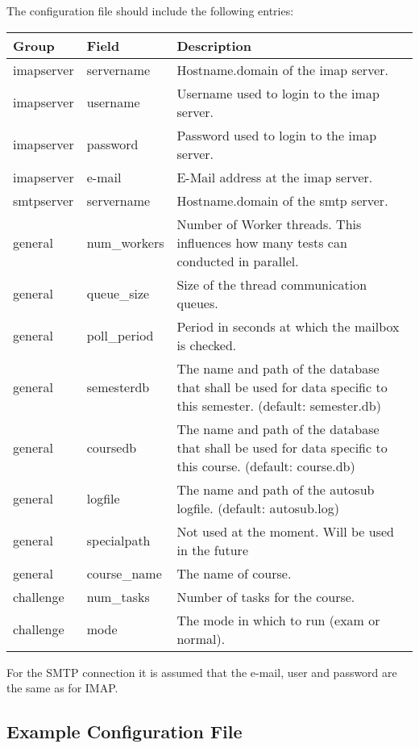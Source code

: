 The configuration file should include the following entries:
\begin{tabular}{|p{4cm}|p{4cm}|p{5cm}|}
\hline

{\bf Group} & {\bf Field} & {\bf Description} \\
\hline
\hline
imapserver & servername & Hostname.domain of the imap server.\\
\hline
imapserver & username & Username used to login to the imap server. \\
\hline
imapserver & password & Password used to login to the imap server. \\
\hline
imapserver & e-mail & E-Mail address at the imap server. \\
\hline
\hline
smtpserver & servername & Hostname.domain of the smtp server.\\
\hline
\hline
general & num\_workers & Number of Worker threads. This influences how many
tests can conducted in parallel. \\
\hline
general & queue\_size & Size of the thread communication queues.\\
\hline
general & poll\_period & Period in seconds at which the mailbox is checked.\\
\hline
general & semesterdb & The name and path of the database that shall be used for data specific to
    this semester. (default: semester.db)\\
\hline
general & coursedb & The name and path of the database that shall be used for data specific to
    this course. (default: course.db)\\
\hline
general & logfile & The name and path of the autosub logfile. (default: autosub.log)\\
\hline
general & specialpath & Not used at the moment. Will be used in the future \\
\hline
general & course\_name & The name of course.\\
\hline
\hline
challenge & num\_tasks & Number of tasks for the course.\\
\hline
challenge & mode & The mode in which to run (exam or normal).\\
\hline
\end{tabular}

For the SMTP connection it is assumed that the e-mail, user and password are the same as for IMAP.


\subsection{Example Configuration File} \label{sub:exampleconfig}

